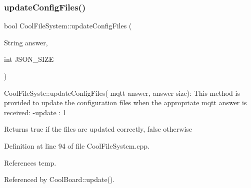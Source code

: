\subsubsection{\texorpdfstring{update\+Config\+Files()}{updateConfigFiles()}}
{\footnotesize\ttfamily bool Cool\+File\+System\+::update\+Config\+Files (\begin{DoxyParamCaption}\item[{String}]{answer,  }\item[{int}]{J\+S\+O\+N\+\_\+\+S\+I\+ZE }\end{DoxyParamCaption})}

Cool\+File\+Syste\+::update\+Config\+Files( mqtt answer, answer size)\+: This method is provided to update the configuration files when the appropriate mqtt answer is received\+: -\/update \+: 1

\begin{DoxyReturn}{Returns}
true if the files are updated correctly, false otherwise 
\end{DoxyReturn}


Definition at line 94 of file Cool\+File\+System.\+cpp.



References temp.



Referenced by Cool\+Board\+::update().


